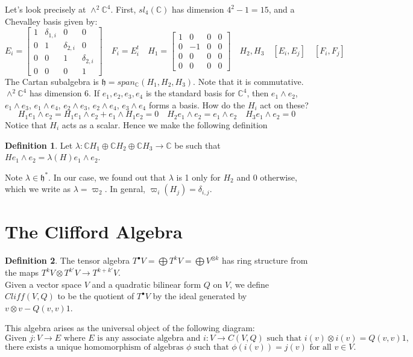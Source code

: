 \documentclass[11pt]{article}
\theoremstyle{definition}
\newtheorem{definition}{Definition}[section]
\theoremstyle{example}
\theoremstyle{remark}
\theoremstyle{lemma}
\theoremstyle{proposition}
\theoremstyle{Problem}
\theoremstyle{Solution}
\theoremstyle{theorem}
\theoremstyle{corollary}
\begin{document}
Let's look precisely at $\wedge^2\mathbb{C}^4$.
First, $sl_4(\mathbb{C})$ has dimension $4^2-1 = 15$, and a Chevalley basis given by:
$$E_i = \begin{bmatrix}
1 & \delta_{1,i} & 0 & 0\\
0 & 1 & \delta_{2,i} & 0\\
0 & 0 & 1 & \delta_{2,i}\\
0 & 0 & 0 & 1
\end{bmatrix}
\quad F_i = E_i^t
\quad H_1 =  \begin{bmatrix}
1 & 0 & 0 & 0\\
0 & -1 & 0 & 0\\
0 & 0 & 0 & 0\\
0 & 0 & 0 & 0
\end{bmatrix}
\quad H_2, H_3
\quad [E_i,E_j]
\quad [F_i,F_j]
$$
The Cartan subalgebra is $\mathfrak{h} = span_\mathbb{C} (H_1, H_2, H_3)$. Note that it is commutative.\\
$\wedge^2\mathbb{C}^4$ has dimension $6$. If $e_1,e_2,e_3,e_4$ is the standard basis for $\mathbb{C}^4$, then $e_1\wedge e_2$, $e_1\wedge e_3$, $e_1\wedge e_4$, $e_2\wedge e_3$, $e_2\wedge e_4$, $e_3\wedge e_4$ forms a basis. How do the $H_i$ act on these?
$$H_1 e_1\wedge e_2 = H_1 e_1 \wedge e_2 + e_1 \wedge H_1 e_2 = 0
\quad H_2 e_1 \wedge e_2 = e_1\wedge e_2
\quad H_3 e_1\wedge e_2 = 0$$
Notice that $H_i$ acts as a scalar. Hence we make the following definition
\begin{definition}
Let $\lambda:\mathbb{C}H_1\oplus\mathbb{C}H_2\oplus \mathbb{C}H_3 \to \mathbb{C}$ be such that $H e_1\wedge e_2 = \lambda(H) e_1\wedge e_2$.
\end{definition}
Note $\lambda \in \mathfrak{h}^*$. In our case, we found out that $\lambda$ is 1 only for $H_2$ and 0 otherwise, which we write as $\lambda = \varpi_2$. In genral, $\varpi_i(H_j) = \delta_{i,j}$.





\section{The Clifford Algebra}
\begin{definition}
The tensor algebra $T^{\bullet}V = \bigoplus T^kV = \bigoplus V^{\otimes k}$ has ring structure from the maps $T^{k}V\otimes T^{k'}V \to T^{k+k'}V$.\\
Given a vector space $V$ and a quadratic bilinear form $Q$ on $V$, we define $Cliff(V,Q)$ to be the quotient of $T^{\bullet}V$ by the ideal generated by $v\otimes v - Q(v,v)1$.
\end{definition}
This algebra arises as the universal object of the following diagram:
$$\text{Given $j:V\to E$ where $E$ is any associate algebra and $i:V\to C(V,Q)$ such that $i(v)\otimes i(v) = Q(v,v)1$,}$$ 
$$\text{there exists a unique homomorphism of algebras $\phi$ such that $\phi(i(v)) = j(v)$ for all $v\in V$.}$$
\end{document}
